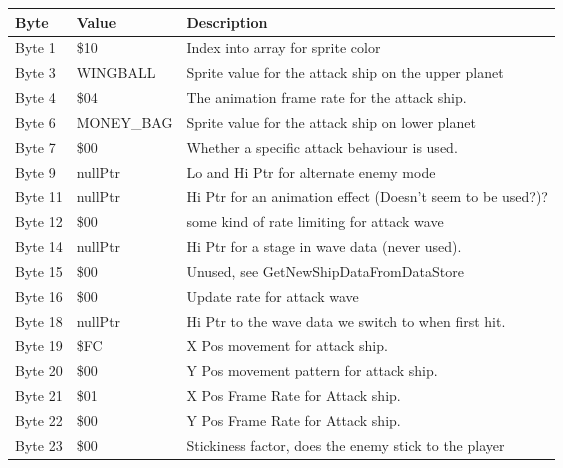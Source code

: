 \begin{figure}[H]
{\begin{adjustbox}{width=12cm}
\begin{tabular}{lll}
\toprule
 Byte    & Value             & Description                                                        \\
\midrule
 Byte 1  & \$10               & Index into array for sprite color                                  \\
 Byte 3  & WINGBALL          & Sprite value for the attack ship on the upper planet               \\
 Byte 4  & \$04               & The animation frame rate for the attack ship.                      \\
 Byte 6  & MONEY\_BAG         & Sprite value for the attack ship on lower planet                   \\
 Byte 7  & \$00               & Whether a specific attack behaviour is used.                       \\
 Byte 9  & nullPtr           & Lo and Hi Ptr for alternate enemy mode                             \\
 Byte 11 & nullPtr           & Hi Ptr for an animation effect (Doesn't seem to be used?)?         \\
 Byte 12 & \$00               & some kind of rate limiting for attack wave                         \\
 Byte 14 & nullPtr           & Hi Ptr for a stage in wave data (never used).                      \\
 Byte 15 & \$00               & Unused, see GetNewShipDataFromDataStore                            \\
 Byte 16 & \$00               & Update rate for attack wave                                        \\
 Byte 18 & nullPtr           & Hi Ptr to the wave data we switch to when first hit.               \\
 Byte 19 & \$FC               & X Pos movement for attack ship.                                    \\
 Byte 20 & \$00               & Y Pos movement pattern for attack ship.                            \\
 Byte 21 & \$01               & X Pos Frame Rate for Attack ship.                                  \\
 Byte 22 & \$00               & Y Pos Frame Rate for Attack ship.                                  \\
 Byte 23 & \$00               & Stickiness factor, does the enemy stick to the player              \\

\end{tabular}
\end{adjustbox}}
\end{figure}
